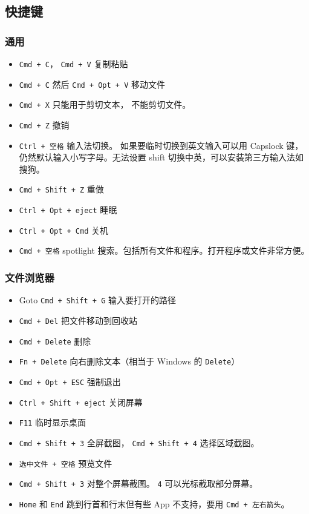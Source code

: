 \subsection{快捷键}

\subsubsection{通用}
\begin{itemize}
\item \verb|Cmd + C|， \verb|Cmd + V| 复制粘贴
\item \verb|Cmd + C| 然后 \verb|Cmd + Opt + V| 移动文件
\item \verb|Cmd + X| 只能用于剪切文本， 不能剪切文件。
\item \verb|Cmd + Z| 撤销
\item \verb|Ctrl + 空格| 输入法切换。 如果要临时切换到英文输入可以用 Capslock 键，仍然默认输入小写字母。无法设置 shift 切换中英，可以安装第三方输入法如搜狗。
\item \verb|Cmd + Shift + Z| 重做
\item \verb|Ctrl + Opt + eject| 睡眠
\item \verb|Ctrl + Opt + Cmd| 关机
\item \verb|Cmd + 空格| spotlight 搜索。包括所有文件和程序。打开程序或文件非常方便。
\end{itemize}

\subsubsection{文件浏览器}
\begin{itemize}
\item Goto \verb`Cmd + Shift + G` 输入要打开的路径
\item \verb|Cmd + Del| 把文件移动到回收站
\item \verb|Cmd + Delete| 删除
\item \verb|Fn + Delete| 向右删除文本（相当于 Windows 的 \verb|Delete|）
\item \verb|Cmd + Opt + ESC| 强制退出
\item \verb|Ctrl + Shift + eject| 关闭屏幕
\item \verb|F11| 临时显示桌面
\item \verb|Cmd + Shift + 3| 全屏截图， \verb|Cmd + Shift + 4| 选择区域截图。
\item \verb|选中文件 + 空格| 预览文件
\item \verb|Cmd + Shift + 3| 对整个屏幕截图。 \verb|4| 可以光标截取部分屏幕。
\item \verb|Home| 和 \verb|End| 跳到行首和行末但有些 App 不支持，要用 \verb|Cmd + 左右箭头|。
\end{itemize}

